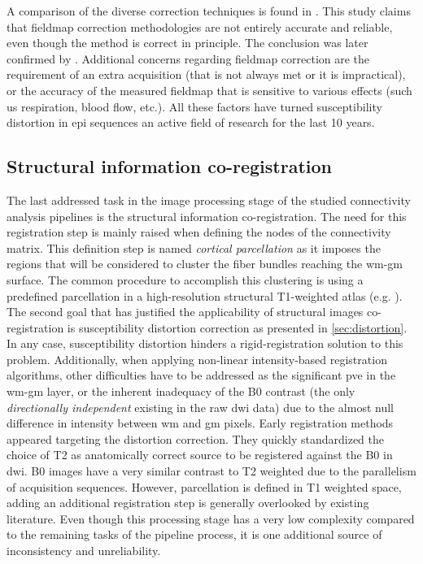 A comparison of the diverse correction techniques is found in \citep{wu_comparison_2008}.
This study claims that fieldmap correction methodologies are not entirely accurate
and reliable, even though the method is correct in principle. The conclusion
was later confirmed by \citep{tao_variational_2009}. Additional concerns regarding
fieldmap correction are the requirement of an extra acquisition (that is not always
met or it is impractical), or the accuracy of the measured fieldmap that is sensitive
to various effects (such us respiration, blood flow, etc.). All these factors 
have turned susceptibility distortion in \gls{epi} sequences an active field of 
research for the last 10 years.


\subsection{Structural information co-registration}
\label{sec:registration}

The last addressed task in the image processing stage of the studied 
connectivity analysis pipelines is the structural information co-registration.
The need for this registration step is mainly raised when defining the 
nodes of the connectivity matrix. This definition step is named
\textit{cortical parcellation} as it imposes the regions that will be
considered to cluster the fiber bundles reaching the \gls{wm}-\gls{gm}
surface. The common procedure to accomplish this clustering is using
a predefined parcellation in a high-resolution structural T1-weighted 
atlas (e.g. \citep{greve_accurate_2009}). The second goal that has 
justified the applicability of structural
images co-registration is susceptibility distortion correction
as presented in \autoref{sec:distortion}. In any case, susceptibility 
distortion hinders a rigid-registration solution to this problem.
Additionally, when applying non-linear intensity-based
registration algorithms, other difficulties have to be addressed as
the significant \gls{pve} in the \gls{wm}-\gls{gm} layer, or the
inherent inadequacy of the B0 contrast (the only \textit{directionally
independent} existing in the raw \gls{dwi} data) due to the almost null
difference in intensity between \gls{wm} and \gls{gm} pixels. Early 
registration methods appeared targeting the distortion correction.
They quickly standardized the choice of T2 as anatomically correct source
to be registered against the B0 in \gls{dwi}. B0 images have a very similar
contrast to T2 weighted due to the parallelism of acquisition sequences.
However, parcellation is defined in T1 weighted space, adding an additional 
registration step is generally overlooked by existing literature. Even though this
processing stage has a very low complexity compared to the remaining tasks of 
the pipeline process, it is one additional source of inconsistency
and unreliability.


